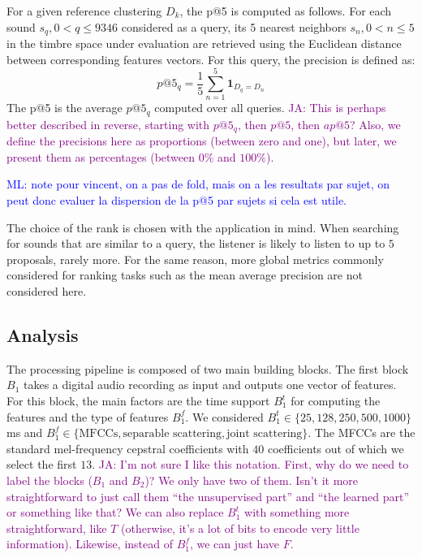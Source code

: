 \documentclass{bmcart}
\newcommand{\ml}[1]{\textcolor{blue}{ML: #1}\xspace}
\newcommand{\ja}[1]{\textcolor{purple}{JA: #1}\xspace}
\begin{document}
For a given reference clustering $D_k$, the p@5 is computed as follows.
For each sound $s_q, 0<q\leq9346$ considered as a query, its 5 nearest neighbors $s_n, 0<n\leq5$ in the timbre space under evaluation are retrieved using the Euclidean distance between corresponding features vectors.
For this query, the precision is defined as:
$$
p@5_q = \frac{1}{5} \sum_{n=1}^5 \mathbf{1}_{D_q=D_n}
$$
The p@5 is the average $p@5_q$ computed over all queries.
\ja{This is perhaps better described in reverse, starting with $p@5_q$, then $p@5$, then $ap@5$?
Also, we define the precisions here as proportions (between zero and one), but later, we present them as percentages (between $0\%$ and $100\%$).}%

\ml{note pour vincent, on a pas de fold, mais on a les resultats par sujet, on peut donc evaluer la dispersion de la p@5 par sujets si cela est utile.}

The choice of the rank is chosen with the application in mind.
When searching for sounds that are similar to a query, the listener is likely to listen to up to $5$ proposals, rarely more.
For the same reason, more global metrics commonly considered for ranking tasks such as the mean average precision are not considered here.


\subsection*{Analysis}

The processing pipeline is composed of two main building blocks.
The first block $B_1$ takes a digital audio recording as input and outputs one vector of features.
For this block, the main factors are the time support $B_1^t$ for computing the features and the type of features $B_1^f$.
We considered $B_1^t \in \{ 25, 128, 250, 500, 1000 \}$ ms and $B_1^f \in \{ \text{MFCCs}, \text{separable scattering}, \text{joint scattering} \}$.
The MFCCs are the standard mel-frequency cepstral coefficients with $40$ coefficients out of which we select the first $13$.
\ja{I'm not sure I like this notation.
First, why do we need to label the blocks ($B_1$ and $B_2$)?
We only have two of them.
Isn't it more straightforward to just call them ``the unsupervised part'' and ``the learned part'' or something like that?
We can also replace $B_1^t$ with something more straightforward, like $T$ (otherwise, it's a lot of bits to encode very little information).
Likewise, instead of $B_1^f$, we can just have $F$.}
\end{document}
